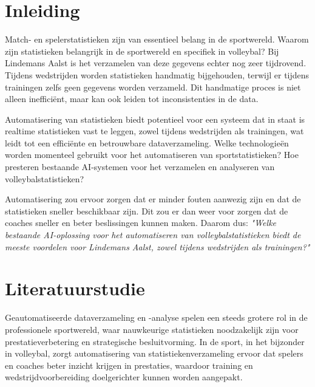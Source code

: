 
\section{Inleiding}%
\label{sec:inleiding}

Match- en spelerstatistieken zijn van essentieel belang in de sportwereld. Waarom zijn statistieken belangrijk in de sportwereld en specifiek in volleybal? Bij Lindemans Aalst is het verzamelen van deze gegevens echter nog zeer tijdrovend. Tijdens wedstrijden worden statistieken handmatig bijgehouden, terwijl er tijdens trainingen zelfs geen gegevens worden verzameld. Dit handmatige proces is niet alleen inefficiënt, maar kan ook leiden tot inconsistenties in de data.

Automatisering van statistieken biedt potentieel voor een systeem dat in staat is realtime statistieken vast te leggen, zowel tijdens wedstrijden als trainingen, wat leidt tot een efficiënte en betrouwbare dataverzameling. Welke technologieën worden momenteel gebruikt voor het automatiseren van sportstatistieken? Hoe presteren bestaande AI-systemen voor het verzamelen en analyseren van volleybalstatistieken?

Automatisering zou ervoor zorgen dat er minder fouten aanwezig zijn en dat de statistieken sneller beschikbaar zijn. Dit zou er dan weer voor zorgen dat de coaches sneller en beter beslissingen kunnen maken. Daarom dus: \textit{"Welke bestaande AI-oplossing voor het automatiseren van volleybalstatistieken biedt de meeste voordelen voor Lindemans Aalst, zowel tijdens wedstrijden als trainingen?"}

\section{Literatuurstudie}%
\label{sec:literatuurstudie}
Geautomatiseerde dataverzameling en -analyse spelen een steeds grotere rol in de professionele sportwereld, waar nauwkeurige statistieken noodzakelijk zijn voor prestatieverbetering en strategische besluitvorming. In de sport, in het bijzonder in volleybal, zorgt automatisering van statistiekenverzameling ervoor dat spelers en coaches beter inzicht krijgen in prestaties, waardoor training en wedstrijdvoorbereiding doelgerichter kunnen worden aangepakt.
